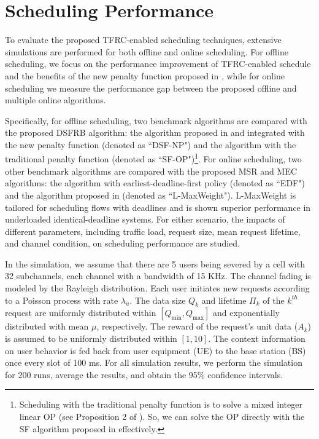 \documentclass[journal,letterpaper,12pt,oneside,onecolumn,draftclsnofoot]{IEEEtran}
\begin{document}
\section{Scheduling Performance}

To evaluate the proposed TFRC-enabled scheduling techniques,  extensive simulations are performed for both offline and online scheduling.
For offline scheduling, we focus on the performance improvement of TFRC-enabled schedule and the benefits of the new penalty function proposed in \cite{Shan_TWC_submitted}, while for online scheduling we measure the performance gap between the proposed offline and multiple online algorithms.

Specifically, for offline scheduling, two benchmark algorithms are compared with the proposed DSFRB algorithm: the algorithm proposed in \cite{1zhang} and integrated with the new penalty function (denoted as ``DSF-NP") and the algorithm with the traditional penalty function (denoted as ``SF-OP")\footnote{Scheduling with the traditional penalty function is to solve a mixed integer linear OP (see Proposition 2 of \cite{Shan_TWC_submitted}). So, we can solve the OP directly with the SF algorithm proposed in \cite{Shan_TWC_submitted} effectively.}.
For online scheduling, two other benchmark algorithms are compared with the proposed MSR and MEC algorithms: the algorithm with earliest-deadline-first policy (denoted as ``EDF") and the algorithm proposed in \cite{Wu_WCNC13} (denoted as ``L-MaxWeight"). L-MaxWeight is tailored for scheduling flows with deadlines and is shown superior performance in underloaded identical-deadline systems.
For either  scenario, the impacts of different parameters, including traffic load, request size, mean request lifetime, and channel condition, on scheduling performance are studied.


In the simulation, we assume that there are 5 users being severed by a cell with 32 subchannels, each channel with a bandwidth of 15 KHz.
The channel fading is modeled by the Rayleigh distribution.
Each user initiates new requests according to a Poisson process with rate ${{\lambda }_{u}}$.
The data size $Q_k$ and lifetime ${\Pi }_{k}$ of the $k^{th}$ request are uniformly distributed within $\left[ {{Q}_{\min }},{{Q}_{\max }} \right]$ and  exponentially distributed with mean $\mu$, respectively.
The reward of the request's unit data ($A_k$) is assumed to be uniformly distributed within $[1, 10]$.
The context information on user behavior is fed back from user equipment (UE) to the base station (BS) once every slot of 100 ms.
For all simulation results, we perform the simulation for 200 runs, average the results, and obtain the 95\% confidence intervals.
\end{document}
